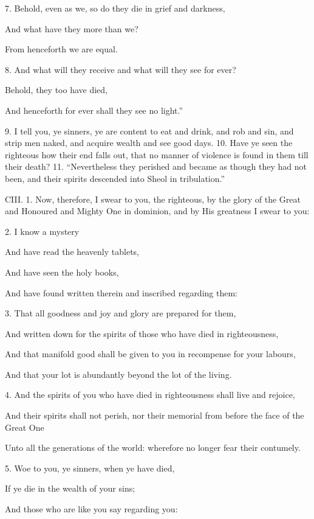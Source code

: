 7. Behold, even as we, so do they die in grief and darkness,

And what have they more than we?

From henceforth we are equal.

8. And what will they receive and what will they see for ever?

Behold, they too have died,

And henceforth for ever shall they see no light.”

9. I tell you, ye sinners, ye are content to eat and
drink, and rob and sin, and strip men naked, and
acquire wealth and see good days. 10. Have ye
seen the righteous how their end falls out, that no
manner of violence is found in them till their death?
11. “Nevertheless they perished and became as though
they had not been, and their spirits descended into
Sheol in tribulation.”


CIII. 1. Now, therefore, I swear to you, the
righteous, by the glory of the Great and Honoured
and Mighty One in dominion, and by His greatness
I swear to you:

2. I know a mystery

And have read the heavenly tablets,

And have seen the holy books,

And have found written therein and inscribed regarding them:

3. That all goodness and joy and glory are prepared for them,

And written down for the spirits of those who have died in righteousness,

And that manifold good shall be given to you in recompense for your labours,

And that your lot is abundantly beyond the lot of the living.

4. And the spirits of you who have died in righteousness shall live and rejoice,

And their spirits shall not perish, nor their memorial from before the face of the Great One

Unto all the generations of the world: wherefore no longer fear their contumely.

5. Woe to you, ye sinners, when ye have died,

If ye die in the wealth of your sins;

And those who are like you say regarding you:

